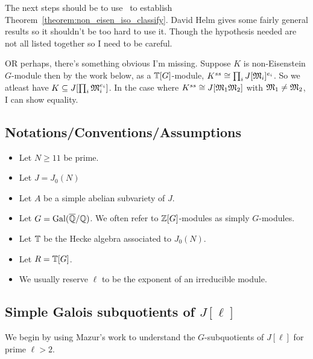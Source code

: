 \documentclass{article}
\begin{document}
The next steps should be to use~\cite[Corollary 4.8]{MR2342491} to establish
Theorem~\ref{theorem:non_eisen_iso_classify}. David Helm gives some fairly
general results so it shouldn't be too hard to use it. Though the hypothesis
needed are not all listed together so I need to be careful. 

OR perhaps, there's something obvious I'm missing. Suppose $K$ is
non-Eisenstein $G$-module then by the work below, as a $\mathbb{T}[G]$-module,
$K^{ss}\cong \prod_i J[\mathfrak{M}_i]^{e_i}$. So we atleast have $K\subseteq J[\prod_i
\mathfrak{M}_i ^{e_i}]$. In the case where $K^{ss} \cong J[\mathfrak{M}_1 \mathfrak{M}_2]$ with $\mathfrak{M}_1\neq
\mathfrak{M}_2$, I can show equality.


\subsection{Notations/Conventions/Assumptions}

\begin{itemize}
    \item
        Let $N\geq 11$ be prime.
    \item
        Let $J=J_0(N)$
    \item
        Let $A$ be a simple abelian subvariety of $J$.
    \item
        Let $G=\operatorname{Gal}(\overline{\mathbb{Q}}/\mathbb{Q})$. We often refer to $\mathbb{Z}[G]$-modules as simply
        $G$-modules.
    \item
        Let $\mathbb{T}$ be the Hecke algebra associated to $J_0(N)$.
    \item
        Let $R=\mathbb{T}[G]$.
    \item
        We usually reserve $\ell$ to be the exponent of an irreducible module.
\end{itemize}

\subsection{Simple Galois subquotients of $J[\ell]$}

We begin by using Mazur's work to understand the $G$-subquotients of $J[\ell]$
for prime $\ell>2$.
\end{document}
